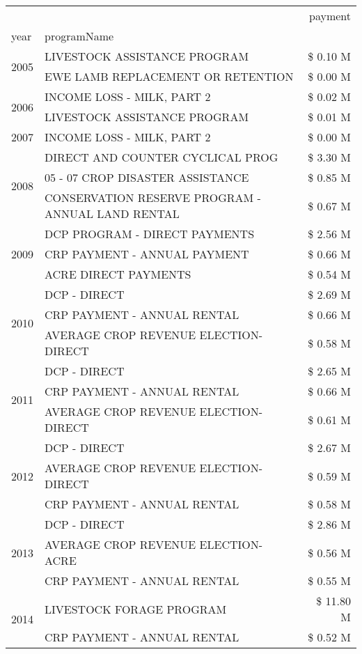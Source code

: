 \begin{tabular}{llr}
\toprule
 &  & payment \\
year & programName &  \\
\midrule
\multirow[t]{2}{*}{2005} & LIVESTOCK ASSISTANCE PROGRAM & \$ 0.10 M \\
 & EWE LAMB REPLACEMENT OR RETENTION & \$ 0.00 M \\
\cline{1-3}
\multirow[t]{2}{*}{2006} & INCOME LOSS - MILK, PART 2 & \$ 0.02 M \\
 & LIVESTOCK ASSISTANCE PROGRAM & \$ 0.01 M \\
\cline{1-3}
2007 & INCOME LOSS - MILK, PART 2 & \$ 0.00 M \\
\cline{1-3}
\multirow[t]{3}{*}{2008} & DIRECT AND COUNTER CYCLICAL PROG & \$ 3.30 M \\
 & 05 - 07 CROP DISASTER ASSISTANCE & \$ 0.85 M \\
 & CONSERVATION RESERVE PROGRAM - ANNUAL LAND RENTAL & \$ 0.67 M \\
\cline{1-3}
\multirow[t]{3}{*}{2009} & DCP PROGRAM - DIRECT PAYMENTS & \$ 2.56 M \\
 & CRP PAYMENT - ANNUAL PAYMENT & \$ 0.66 M \\
 & ACRE DIRECT PAYMENTS & \$ 0.54 M \\
\cline{1-3}
\multirow[t]{3}{*}{2010} & DCP - DIRECT & \$ 2.69 M \\
 & CRP PAYMENT - ANNUAL RENTAL & \$ 0.66 M \\
 & AVERAGE CROP REVENUE ELECTION-DIRECT & \$ 0.58 M \\
\cline{1-3}
\multirow[t]{3}{*}{2011} & DCP - DIRECT & \$ 2.65 M \\
 & CRP PAYMENT - ANNUAL RENTAL & \$ 0.66 M \\
 & AVERAGE CROP REVENUE ELECTION-DIRECT & \$ 0.61 M \\
\cline{1-3}
\multirow[t]{3}{*}{2012} & DCP - DIRECT & \$ 2.67 M \\
 & AVERAGE CROP REVENUE ELECTION-DIRECT & \$ 0.59 M \\
 & CRP PAYMENT - ANNUAL RENTAL & \$ 0.58 M \\
\cline{1-3}
\multirow[t]{3}{*}{2013} & DCP - DIRECT & \$ 2.86 M \\
 & AVERAGE CROP REVENUE ELECTION-ACRE & \$ 0.56 M \\
 & CRP PAYMENT - ANNUAL RENTAL & \$ 0.55 M \\
\cline{1-3}
\multirow[t]{3}{*}{2014} & LIVESTOCK FORAGE PROGRAM & \$ 11.80 M \\
 & CRP PAYMENT - ANNUAL RENTAL & \$ 0.52 M \\

\end{tabular}
